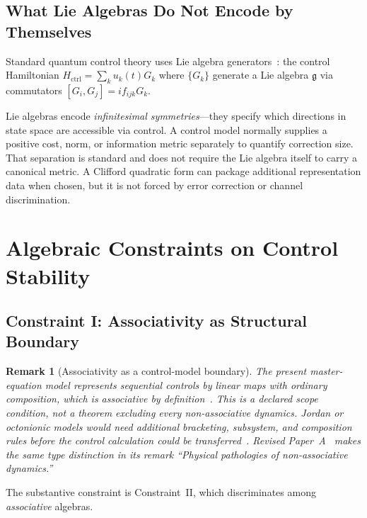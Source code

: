 \documentclass[12pt,a4paper,openany]{book}
\newtheorem{remark}[theorem]{Remark}
\begin{document}
\subsection{What Lie Algebras Do Not Encode by Themselves}

Standard quantum control theory uses Lie algebra generators~\cite{WisemanMilburn2009}: the control Hamiltonian $H_{\mathrm{ctrl}} = \sum_k u_k(t) G_k$ where $\{G_k\}$ generate a Lie algebra $\mathfrak{g}$ via commutators $[G_i, G_j] = i f_{ijk} G_k$.

Lie algebras encode \emph{infinitesimal symmetries}---they specify which directions in state space are accessible via control.  A control model normally supplies a positive cost, norm, or information metric separately to quantify correction size.  That separation is standard and does not require the Lie algebra itself to carry a canonical metric.  A Clifford quadratic form can package additional representation data when chosen, but it is not forced by error correction or channel discrimination.

\section{Algebraic Constraints on Control Stability}
\label{Q-B-sec:stability}

\subsection{Constraint I: Associativity as Structural Boundary}
\label{Q-B-sec:assoc}

\begin{remark}[Associativity as a control-model boundary]
\label{Q-B-rem:assoc-boundary}
The present master-equation model represents sequential controls by linear maps with ordinary composition, which is associative by definition~\cite{Breuer2002}.  This is a declared scope condition, not a theorem excluding every non-associative dynamics.  Jordan or octonionic models would need additional bracketing, subsystem, and composition rules before the control calculation could be transferred~\cite{Schafer1966,Gunaydin1973}.  Revised Paper~A~\cite{Liu2026QRAIF_A} makes the same type distinction in its remark ``Physical pathologies of non-associative dynamics.''
\end{remark}

The substantive constraint is Constraint~II, which discriminates among \emph{associative} algebras.
\end{document}
